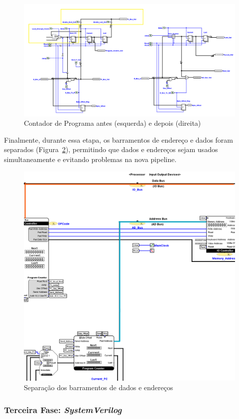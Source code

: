 \documentclass[
	12pt,				%
	openright,			%
	oneside,			%
	a4paper,			%
	english,			%
	french,				%
	spanish,			%
	brazil,				%
	]{abntex2}
\begin{document}
\begin{figure}[t]
    \centering
    \includegraphics[width=0.8\linewidth]{ProcessoDesenvolvimento/Arquitetura/ContadorDePrograma1.png}
    \caption{Contador de Programa antes (esquerda) e depois (direita)}
    \label{fig:ContadorDePrograma1}
\end{figure}

Finalmente, durante essa etapa, os barramentos de endereço e dados foram separados (Figura~\ref{fig:barramentosSepara}), permitindo que dados e endereços sejam usados simultaneamente e evitando problemas na nova pipeline.

\begin{figure}[H]
    \centering
    \includegraphics[width=0.8\linewidth]{ProcessoDesenvolvimento/Arquitetura/SeparacaoBarramentos.png}
    \caption{Separação dos barramentos de dados e endereços}
    \label{fig:barramentosSepara}
\end{figure}


\subsubsection{Terceira Fase: \textit{SystemVerilog}}
\end{document}
